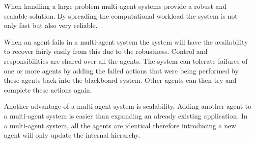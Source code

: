 
When handling a large problem multi-agent systems provide a robust and scalable solution. 
By spreading the computational workload the system is not only fast but also very reliable.

When an agent fails in a multi-agent system the system will have the availability to 
recover fairly easily from this due to the robustness. 
Control and responsibilities are shared over all the agents. 
The system can tolerate failures of one or more agents by adding the failed actions 
that were being performed by these agents back into the blackboard system. 
Other agents can then try and complete these actions again.

Another advantage of a multi-agent system is scalability. 
Adding another agent to a multi-agent system is easier than expanding an already existing application. 
In a multi-agent system, all the agents are identical therefore introducing a new agent will only update the internal hierarchy.
